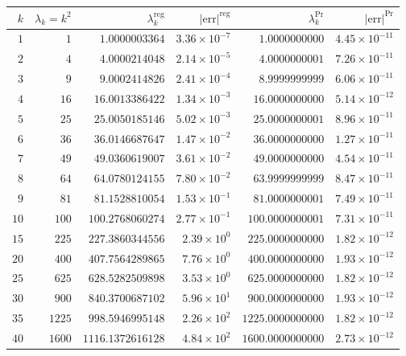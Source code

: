 \documentclass[12pt,reqno]{amsart}
\numberwithin{equation}{section}
\begin{document}
\begin{table}[ht]
\centering\footnotesize
\setlength{\tabcolsep}{5pt}
\begin{tabular}{rrrrrr}
\toprule
$k$ & $\lambda_k = k^2$ & $\lambda_k^{\text{reg}}$ & $|\text{err}|^{\text{reg}}$ & $\lambda_k^{\text{Pr}}$ & $|\text{err}|^{\text{Pr}}$ \\
\midrule
$1$  & $1$    & $1.0000003364$    & $3.36\times 10^{-7}$ & $1.0000000000$    & $4.45\times 10^{-11}$ \\
$2$  & $4$    & $4.0000214048$    & $2.14\times 10^{-5}$ & $4.0000000001$    & $7.26\times 10^{-11}$ \\
$3$  & $9$    & $9.0002414826$    & $2.41\times 10^{-4}$ & $8.9999999999$    & $6.06\times 10^{-11}$ \\
$4$  & $16$   & $16.0013386422$   & $1.34\times 10^{-3}$ & $16.0000000000$   & $5.14\times 10^{-12}$ \\
$5$  & $25$   & $25.0050185146$   & $5.02\times 10^{-3}$ & $25.0000000001$   & $8.96\times 10^{-11}$ \\
$6$  & $36$   & $36.0146687647$   & $1.47\times 10^{-2}$ & $36.0000000000$   & $1.27\times 10^{-11}$ \\
$7$  & $49$   & $49.0360619007$   & $3.61\times 10^{-2}$ & $49.0000000000$   & $4.54\times 10^{-11}$ \\
$8$  & $64$   & $64.0780124155$   & $7.80\times 10^{-2}$ & $63.9999999999$   & $8.47\times 10^{-11}$ \\
$9$  & $81$   & $81.1528810054$   & $1.53\times 10^{-1}$ & $81.0000000001$   & $7.49\times 10^{-11}$ \\
$10$ & $100$  & $100.2768060274$  & $2.77\times 10^{-1}$ & $100.0000000001$  & $7.31\times 10^{-11}$ \\
$15$ & $225$  & $227.3860344556$  & $2.39\times 10^{0}$  & $225.0000000000$  & $1.82\times 10^{-12}$ \\
$20$ & $400$  & $407.7564289865$  & $7.76\times 10^{0}$  & $400.0000000000$  & $1.93\times 10^{-12}$ \\
$25$ & $625$  & $628.5282509898$  & $3.53\times 10^{0}$  & $625.0000000000$  & $1.82\times 10^{-12}$ \\
$30$ & $900$  & $840.3700687102$  & $5.96\times 10^{1}$  & $900.0000000000$  & $1.93\times 10^{-12}$ \\
$35$ & $1225$ & $998.5946995148$  & $2.26\times 10^{2}$  & $1225.0000000000$ & $1.82\times 10^{-12}$ \\
$40$ & $1600$ & $1116.1372616128$ & $4.84\times 10^{2}$  & $1600.0000000000$ & $2.73\times 10^{-12}$ \\

\end{tabular}
\end{table}
\end{document}
